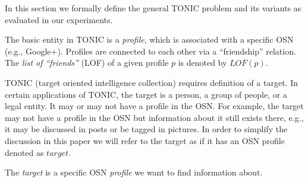 \documentclass[journal]{IEEEtran}
\begin{document}





In this section we formally define the general TONIC problem and its variants as evaluated in our experiments. %


\begin{definition}[profiles]
The basic entity in TONIC is a {\em profile}, which is associated with a specific OSN (e.g., Google+). Profiles are connected to each other via a ``friendship'' relation.  The {\em list of ``friends''} (LOF) of a given profile $p$ is denoted by $LOF(p)$. 
\label{def:profile}
\end{definition}

TONIC (target oriented intelligence collection) requires definition of a target. 
In certain applications of TONIC, the target is a person, a group of people, or a legal entity. 
It may or may not have a profile in the OSN. For example, the target may not have a profile in the OSN but information about it still exists there, e.g., it may be discussed in posts or be tagged in pictures. 
In order to simplify the discussion in this paper we will refer to the target as if it has an OSN profile denoted as $\mathit{target}$. 


\begin{definition}[Target]
The {\em target} is a specific OSN {\em profile} we want to find information about. 
\label{def:Target}
\end{definition}
\end{document}
